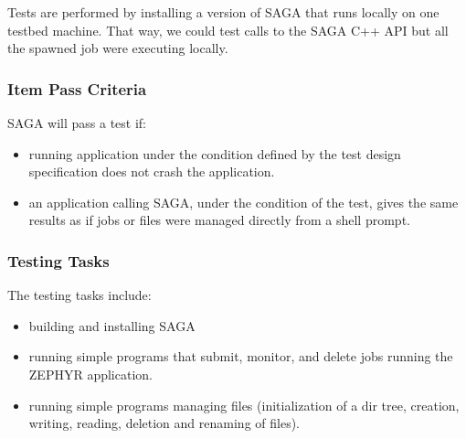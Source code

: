 Tests are performed by installing a version of SAGA that runs locally on
one testbed machine. That way, we could test calls to the SAGA C++ API
but all the spawned job were executing locally. 




\subsubsection{Item Pass Criteria}

SAGA will pass a test if:
\begin{itemize}
\item running application under the condition defined by the test design
      specification does not crash the application.
\item an application calling SAGA, under the condition of the test,
      gives the same results as if jobs or files were managed directly
      from a shell prompt.

\end{itemize}


\subsubsection{Testing Tasks}

The testing tasks include:
\begin{itemize}
\item building and installing SAGA
\item running simple programs that submit, monitor, and delete jobs
      running the ZEPHYR application.
\item running simple programs managing files (initialization of a dir
      tree, creation, writing, reading, deletion and renaming of files).
\end{itemize}

